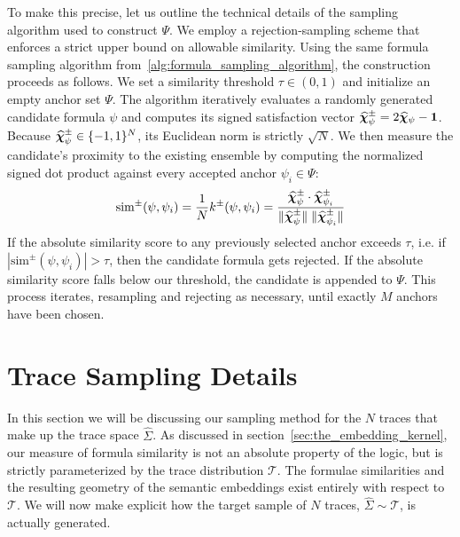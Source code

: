 \documentclass[titlepage,a4paper,11pt]{report}
\begin{document}
    To make this precise, let us outline the technical details of the sampling algorithm used to construct $\Psi$. We employ a rejection-sampling scheme that enforces a strict upper bound on allowable similarity. Using the same formula sampling algorithm from~\ref{alg:formula_sampling_algorithm}, the construction proceeds as follows. We set a similarity threshold $\tau \in (0, 1)$ and initialize an empty anchor set $\Psi$. The algorithm iteratively evaluates a randomly generated candidate formula $\psi$ and computes its signed satisfaction vector $\bm{\widehat\chi}_\psi^\pm = 2\bm{\widehat\chi}_\psi - \mathbf{1}$. Because $\bm{\widehat\chi}_\psi^\pm \in \{-1, 1\}^N$, its Euclidean norm is strictly $\sqrt{N}$. We then measure the candidate's proximity to the existing ensemble by computing the normalized signed dot product against every accepted anchor $\psi_i \in \Psi$:
    \begin{equation}
        \text{sim}^\pm(\psi, \psi_i) = \frac{1}{N} k^\pm(\psi, \psi_i) = \frac{\bm{\widehat\chi}_\psi^\pm \cdot \bm{\widehat\chi}_{\psi_i}^\pm}{\Vert \bm{\widehat\chi}_\psi^\pm \Vert \; \Vert \bm{\widehat\chi}_{\psi_i}^\pm \Vert}
    \end{equation}
    If the absolute similarity score to any previously selected anchor exceeds $\tau$, i.e. if $|\text{sim}^\pm(\psi, \psi_i)| > \tau$, then the candidate formula gets rejected. If the absolute similarity score falls below our threshold, the candidate is appended to $\Psi$. This process iterates, resampling and rejecting as necessary, until exactly $M$ anchors have been chosen. 

    

    \section{Trace Sampling Details} \label{sec:trace_sampling_details}
    In this section we will be discussing our sampling method for the $N$ traces that make up the trace space $\widehat \Sigma$. As discussed in section~\ref{sec:the_embedding_kernel}, our measure of formula similarity is not an absolute property of the logic, but is strictly parameterized by the trace distribution $\mathcal{T}$. The formulae similarities and the resulting geometry of the semantic embeddings exist entirely with respect to $\mathcal{T}$. We will now make explicit how the target sample of $N$ traces, $\widehat\Sigma \sim \mathcal{T}$, is actually generated.
\end{document}
